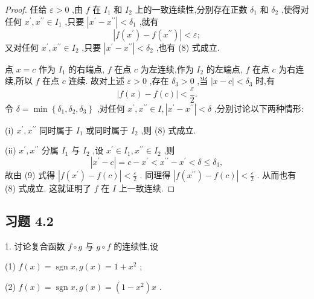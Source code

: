 \begin{proof}
任给 \(\varepsilon  > 0\) ,由 \(f\) 在 \({I}_{1}\) 和 \({I}_{2}\) 上的一致连续性,分别存在正数 \({\delta }_{1}\) 和 \({\delta }_{2}\) ,使得对任何 \({x}^{\prime },{x}^{\prime \prime } \in  {I}_{1}\) ,只要 \(\left| {{x}^{\prime } - {x}^{\prime \prime }}\right|  < {\delta }_{1}\) ,就有
\[
\left| {f\left( {x}^{\prime }\right)  - f\left( {x}^{\prime \prime }\right) }\right|  < \varepsilon ; \tag{8}
\]
又对任何 \({x}^{\prime },{x}^{\prime \prime } \in  {I}_{2}\) ,只要 \(\left| {{x}^{\prime } - {x}^{\prime \prime }}\right|  < {\delta }_{2}\) ,也有 (8) 式成立.

点 \(x = c\) 作为 \({I}_{1}\) 的右端点, \(f\) 在点 \(c\) 为左连续,作为 \({I}_{2}\) 的左端点, \(f\) 在点 \(c\) 为右连续,所以 \(f\) 在点 \(c\) 连续. 故对上述 \(\varepsilon  > 0\) ,存在 \({\delta }_{3} > 0\) ,当 \(\left| {x - c}\right|  < {\delta }_{3}\) 时,有
\[
\left| {f\left( x\right)  - f\left( c\right) }\right|  < \frac{\varepsilon }{2}. \tag{9}
\]
令 \(\delta  = \min \left\{  {{\delta }_{1},{\delta }_{2},{\delta }_{3}}\right\}\) ,对任何 \({x}^{\prime },{x}^{\prime \prime } \in  I,\left| {{x}^{\prime } - {x}^{\prime \prime }}\right|  < \delta\) ,分别讨论以下两种情形:

(i) \({x}^{\prime },{x}^{\prime \prime }\) 同时属于 \({I}_{1}\) 或同时属于 \({I}_{2}\) ,则 (8) 式成立.

(ii) \({x}^{\prime },{x}^{\prime \prime }\) 分属 \({I}_{1}\) 与 \({I}_{2}\) ,设 \({x}^{\prime } \in  {I}_{1},{x}^{\prime \prime } \in  {I}_{2}\) ,则
\[
\left| {{x}^{\prime } - c}\right|  = c - {x}^{\prime } < {x}^{\prime \prime } - {x}^{\prime } < \delta  \leq  {\delta }_{3},
\]
故由 (9) 式得 \(\left| {f\left( {x}^{\prime }\right)  - f\left( c\right) }\right|  < \frac{\varepsilon }{2}\) . 同理得 \(\left| {f\left( {x}^{\prime \prime }\right)  - f\left( c\right) }\right|  < \frac{\varepsilon }{2}\) . 从而也有 (8) 式成立. 这就证明了 \(f\) 在 \(I\) 上一致连续.
\end{proof}


\subsection{习题 4.2}

1. 讨论复合函数 \(f \circ  g\) 与 \(g \circ  f\) 的连续性,设

(1) \(f\left( x\right)  = \operatorname{sgn}x,g\left( x\right)  = 1 + {x}^{2}\) ;

(2) \(f\left( x\right)  = \operatorname{sgn}x,g\left( x\right)  = \left( {1 - {x}^{2}}\right) x\) .

